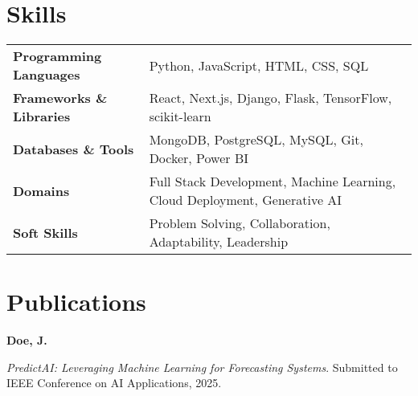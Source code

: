 \documentclass[a4paper,12pt]{article}
\begin{document}
\section{Skills}
\begin{tabularx}{\linewidth}{@{}l X@{}}
\textbf{Programming Languages} & Python, JavaScript, HTML, CSS, SQL \\
\textbf{Frameworks \& Libraries} & React, Next.js, Django, Flask, TensorFlow, scikit-learn \\
\textbf{Databases \& Tools} & MongoDB, PostgreSQL, MySQL, Git, Docker, Power BI \\
\textbf{Domains} & Full Stack Development, Machine Learning, Cloud Deployment, Generative AI \\
\textbf{Soft Skills} & Problem Solving, Collaboration, Adaptability, Leadership \\
\end{tabularx}

\section{Publications}
\noindent
\textbf{Doe, J.} \\
\begin{minipage}[t]{\linewidth}
\textit{PredictAI: Leveraging Machine Learning for Forecasting Systems}. Submitted to IEEE Conference on AI Applications, 2025.
\end{minipage}


\vfill
{}
\end{document}
